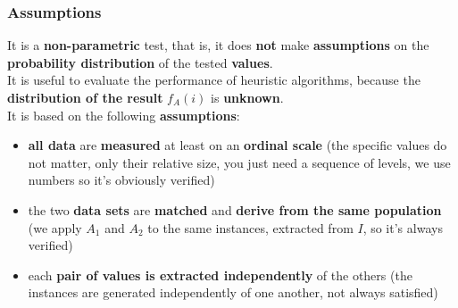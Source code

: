 \newpage

\subsubsection{Assumptions} 
It is a \textbf{non-parametric} test, that is, it does \textbf{not} make \textbf{assumptions} on the \textbf{probability distribution} of the tested \textbf{values}.\\

It is useful to evaluate the performance of heuristic algorithms, because the \textbf{distribution of the result} $f_A (i )$ is \textbf{unknown}. \\

It is based on the following \textbf{assumptions}:
\begin{itemize}
	\item \textbf{all data} are \textbf{measured} at least on an \textbf{ordinal scale} (the specific values do not matter, only their relative size, you just need a sequence of levels, we use numbers so it's obviously verified)
	\item the two \textbf{data sets} are \textbf{matched} and \textbf{derive from the same population} (we apply $A_1$ and $A_2$ to the same instances, extracted from $I$, so it's always verified)
	\item each \textbf{pair of values is extracted independently} of the others (the instances are generated independently of one another, not always satisfied)
\end{itemize}

\newpage

